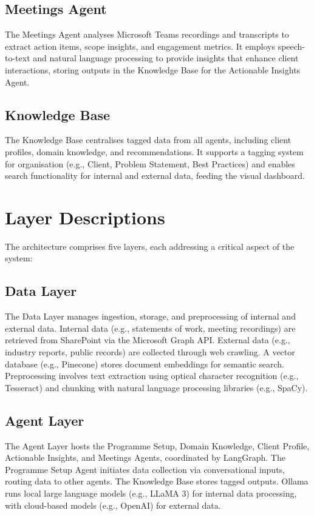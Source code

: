 \documentclass{article}
\begin{document}
\subsection{Meetings Agent}
The Meetings Agent analyses Microsoft Teams recordings and transcripts to extract action items, scope insights, and engagement metrics. It employs speech-to-text and natural language processing to provide insights that enhance client interactions, storing outputs in the Knowledge Base for the Actionable Insights Agent.

\subsection{Knowledge Base}
The Knowledge Base centralises tagged data from all agents, including client profiles, domain knowledge, and recommendations. It supports a tagging system for organisation (e.g., Client, Problem Statement, Best Practices) and enables search functionality for internal and external data, feeding the visual dashboard.

\section{Layer Descriptions}
The architecture comprises five layers, each addressing a critical aspect of the system:

\subsection{Data Layer}
The Data Layer manages ingestion, storage, and preprocessing of internal and external data. Internal data (e.g., statements of work, meeting recordings) are retrieved from SharePoint via the Microsoft Graph API. External data (e.g., industry reports, public records) are collected through web crawling. A vector database (e.g., Pinecone) stores document embeddings for semantic search. Preprocessing involves text extraction using optical character recognition (e.g., Tesseract) and chunking with natural language processing libraries (e.g., SpaCy).

\subsection{Agent Layer}
The Agent Layer hosts the Programme Setup, Domain Knowledge, Client Profile, Actionable Insights, and Meetings Agents, coordinated by LangGraph. The Programme Setup Agent initiates data collection via conversational inputs, routing data to other agents. The Knowledge Base stores tagged outputs. Ollama runs local large language models (e.g., LLaMA 3) for internal data processing, with cloud-based models (e.g., OpenAI) for external data.
\end{document}
